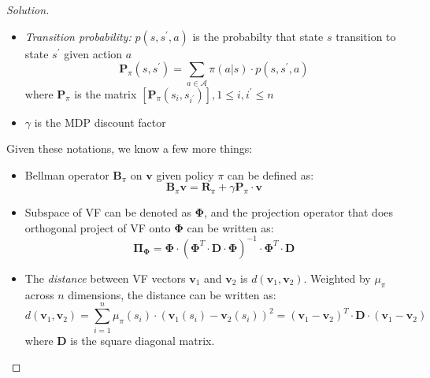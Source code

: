 \documentclass[12pt]{article}
\newenvironment{solution}
  {\renewcommand\qedsymbol{$\blacksquare$}\begin{proof}[Solution]}
  {\end{proof}}
\begin{document}
\begin{solution}
\begin{itemize} [noitemsep]
	where $\mathbf{R}_{\pi}(s)$ is the vector $\left[\mathbf{R}_{\pi}\left(s_{1}\right), \mathbf{R}_{\pi}\left(s_{2}\right), \ldots, \mathbf{R}_{\pi}\left(s_{n}\right)\right]$
	\item \textit{Transition probability:} $p(s, s^\prime, a)$ is the probabilty that state $s$ transition to state $s^\prime$ given action $a$
	\begin{equation}
		\mathbf{P}_{\pi}\left(s, s^{\prime}\right) =\sum_{a \in \mathcal{A}} \pi(a | s) \cdot p\left(s, s^{\prime}, a\right)
	\end{equation}
	where $\mathbf{P}_{\pi}$ is the matrix $\left[\mathbf{P}_{\pi}\left(s_{i}, s_{i^{\prime}}\right)\right], 1 \leq i, i^{\prime} \leq n$
	\item $\gamma$ is the \gls{MDP} discount factor
 \end{itemize}

Given these notations, we know a few more things:
\begin{itemize}
		\item Bellman operator $\mathbf{B}_\pi$ on $\mathbf{v}$ given policy $\pi$ can be defined as:
	\begin{equation}
	\mathbf{B}_{\pi} \mathbf{v}=\mathbf{R}_{\pi}+\gamma \mathbf{P}_{\pi} \cdot \mathbf{v}
	\end{equation}
	\item Subspace of \gls{VF} can be denoted as $\mathbf{\Phi}$, and the projection operator that does orthogonal project of \gls{VF} onto $\mathbf{\Phi}$ can be written as:
	\begin{equation}
	\boldsymbol{\Pi}_{\boldsymbol{\Phi}}=\boldsymbol{\Phi} \cdot\left(\boldsymbol{\Phi}^{T} \cdot \mathbf{D} \cdot \boldsymbol{\Phi}\right)^{-1} \cdot \boldsymbol{\Phi}^{T} \cdot \mathbf{D}
	\end{equation}
	\item The \textit{distance} between \gls{VF} vectors $\mathbf{v}_1$ and $\mathbf{v}_2$ is $d(\mathbf{v}_1, \mathbf{v}_2)$. Weighted by $\mu_\pi$ across $n$ dimensions, the distance can be written as:
	\begin{equation}
	d\left(\mathbf{v}_{1}, \mathbf{v}_{2}\right)=\sum_{i=1}^{n} \mu_{\pi}\left(s_{i}\right) \cdot\left(\mathbf{v}_{1}\left(s_{i}\right)-\mathbf{v}_{2}\left(s_{i}\right)\right)^{2}=\left(\mathbf{v}_{1}-\mathbf{v}_{2}\right)^{T} \cdot \mathbf{D} \cdot\left(\mathbf{v}_{1}-\mathbf{v}_{2}\right)
	\end{equation}
	where $\mathbf{D}$ is the square diagonal matrix.
\end{itemize}


\end{solution}
\end{document}
